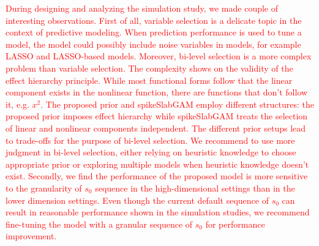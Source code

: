 \documentclass[AMA,STIX1COL,]{WileyNJD-v2}
\begin{document}
\textcolor{red}{During designing and analyzing the simulation study, we made couple of interesting observations. First of all, variable selection is a delicate topic in the context of predictive modeling. When prediction performance is used to tune a model, the model could possibly include noise variables in models, for example LASSO and LASSO-based models. \cite{Wu2019} Moreover, bi-level selection is a more complex problem than variable selection. The complexity shows on the validity of the effect hierarchy principle. While most functional forms follow that the linear component exists in the nonlinear function, there are functions that don't follow it, e.g. $x^2$. The proposed prior and spikeSlabGAM employ different structures: the proposed prior imposes effect hierarchy while spikeSlabGAM treats the selection of linear and nonlinear components independent. The different prior setups lead to trade-offs for the purpose of bi-level selection. We recommend to use more judgment in bi-level selection, either relying on heuristic knowledge to choose appropriate prior or exploring multiple models when heuristic knowledge doesn't exist. Secondly, we find the performance of the proposed model is more sensitive to the granularity of $s_0$ sequence in the high-dimensional settings than in the lower dimension settings. Even though the current default sequence of $s_0$ can result in reasonable performance shown in the simulation studies, we recommend fine-tuning the model with a granular sequence of $s_0$ for performance improvement.}
\end{document}
